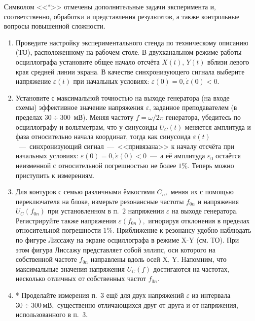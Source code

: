 \begin{lab:task}
Символом <<*>> отмечены дополнительные задачи эксперимента и, соответственно, обработки и представления результатов, а также контрольные вопросы повышенной сложности.
	\begin{enumerate}
    \item Проведите настройку экспериментального стенда по техническому описанию (ТО), расположенному на рабочем столе. В двухканальном режиме работы осциллографа установите общее начало отсчёта $X(t)$, $Y(t)$ вблизи левого края средней линии экрана. В качестве синхронизующего сигнала выберите напряжение $\varepsilon(t)$ при начальных условиях: $\varepsilon(0)=0, \dot{\varepsilon}(0)<0.$
    
    \item Установите с максимальной точностью на выходе генератора (на входе схемы) эффективное значение напряжения $\varepsilon$, заданное преподавателем (в пределах $30\div300$~мВ). Меняя частоту $f=\omega/2\pi$ генератора, убедитесь по осциллографу и вольтметрам, что у синусоиды $U_C(t)$ меняется амплитуда и фаза относительно начала координат, тогда как синусоида $\varepsilon(t)$~---~синхронизующий сигнал~---~<<привязана>> к началу отсчёта при начальных условиях: $\varepsilon(0)=0, \dot{\varepsilon}(0)<0$~---~а её амплитуда $\varepsilon_0$ остаётся неизменной с относительной погрешностью не более $1\%$. Теперь можно приступить к измерениям.
    
    \item Для контуров с семью различными ёмкостями $C_n,$ меняя их с помощью переключателя на блоке, измерьте резонансные частоты $f_{0n}$ и напряжения $U_C(f_{0n})$ при установленном в п.~2 напряжении $\varepsilon$ на выходе генератора. Регистрируйте также напряжения $\varepsilon(f_{0n}),$ игнорируя отклонения в пределах относительной погрешности $1\%$. Приближение к резонансу удобно наблюдать по фигуре Лиссажу на экране осциллографа в режиме X-Y (см. ТО). При этом фигура Лиссажу представляет собой эллипс, оси которого на собственной частоте $f_{0n}$ направлены вдоль осей X, Y. Напомним, что максимальные значения напряжения $U_C(f)$ достигаются на частотах, несколько отличных от собственных частот $f_{0n}.$
    
    \item * Проделайте измерения п.~3 ещё для двух напряжений $\varepsilon$ из интервала $30\div 300~мВ,$ существенно отличающихся друг от друга и от напряжения, использованного в п.~3.
    

\end{enumerate}
\end{lab:task}
